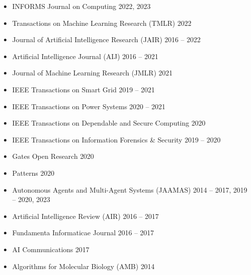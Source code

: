 \begin{itemize}
  \item INFORMS Journal on Computing \hfill{2022, 2023}
  
  \item  Transactions on Machine Learning Research (TMLR) \hfill{2022}

  \item Journal of Artificial Intelligence Research (JAIR) \hfill{2016 -- 2022}

  \item Artificial Intelligence Journal (AIJ) \hfill{2016 -- 2021}

  \item Journal of Machine Learning Research (JMLR) \hfill{2021}
 
  \item IEEE Transactions on Smart Grid \hfill{2019 -- 2021}

  \item IEEE Transactions on Power Systems \hfill{2020 -- 2021}

  \item IEEE Transactions on Dependable and Secure Computing \hfill{2020}

  \item IEEE Transactions on Information Forensics \& Security \hfill{2019 -- 2020}

  \item Gates Open Research \hfill{2020}

  \item Patterns \hfill{2020}

  \item Autonomous Agents and Multi-Agent Systems (JAAMAS) \hfill {2014 -- 2017, 2019 -- 2020, 2023}

  \item Artificial Intelligence Review (AIR) \hfill{2016 -- 2017}
  \item Fundamenta Informaticae Journal \hfill{2016 -- 2017}
  \item AI Communications \hfill{2017}  
  \item Algorithms for Molecular Biology (AMB) \hfill {2014}
\end{itemize}

